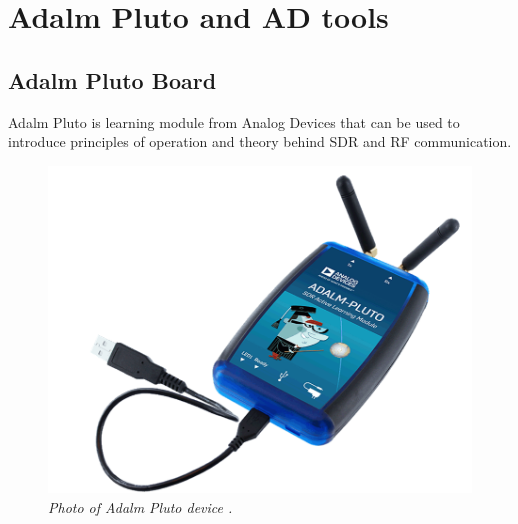 \documentclass[en,printmode]{mgr}
\begin{document}
	\section{Adalm Pluto and AD tools}
		\subsection*{Adalm Pluto Board}
			Adalm Pluto is learning module from Analog Devices that can be used to introduce 
			principles of operation and theory behind SDR and RF communication.
			
			\begin{figure}[!htb]
    			\centering
   				\includegraphics[width=\textwidth]{images/plutoimg.png}
    			\caption{\textit{Photo of Adalm Pluto device \cite{pluto_photo}.}}
			\end{figure}
			\newpage
\end{document}
